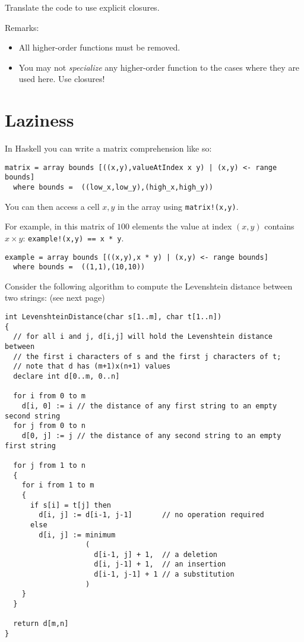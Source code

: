 \documentclass{article}
\begin{document}
Translate the code to use explicit closures. 

Remarks:
\begin{itemize}
\item All higher-order functions must be removed.
\item You may not \emph{specialize} any higher-order function to the
  cases where they are used here. Use closures!
\end{itemize}

\newpage
\section{Laziness}

In Haskell you can write a matrix comprehension like so:
\begin{verbatim}
matrix = array bounds [((x,y),valueAtIndex x y) | (x,y) <- range bounds]
  where bounds =  ((low_x,low_y),(high_x,high_y))
\end{verbatim}

You can then access a cell $x,y$ in the array using \texttt{matrix!(x,y)}.

For example, in this matrix of $100$ elements the value at index $(x,y)$ contains $x ×
y$: \texttt{example!(x,y) == x * y}.
\begin{verbatim}
example = array bounds [((x,y),x * y) | (x,y) <- range bounds]
  where bounds =  ((1,1),(10,10))
\end{verbatim}


Consider the following algorithm to compute the Levenshtein distance between two strings:
(see next page)
\newpage
\begin{verbatim}
int LevenshteinDistance(char s[1..m], char t[1..n])
{
  // for all i and j, d[i,j] will hold the Levenshtein distance between
  // the first i characters of s and the first j characters of t;
  // note that d has (m+1)x(n+1) values
  declare int d[0..m, 0..n]

  for i from 0 to m
    d[i, 0] := i // the distance of any first string to an empty second string
  for j from 0 to n
    d[0, j] := j // the distance of any second string to an empty first string

  for j from 1 to n
  {
    for i from 1 to m
    {
      if s[i] = t[j] then
        d[i, j] := d[i-1, j-1]       // no operation required
      else
        d[i, j] := minimum
                   (
                     d[i-1, j] + 1,  // a deletion
                     d[i, j-1] + 1,  // an insertion
                     d[i-1, j-1] + 1 // a substitution
                   )
    }
  }

  return d[m,n]
}
\end{verbatim}
\end{document}
